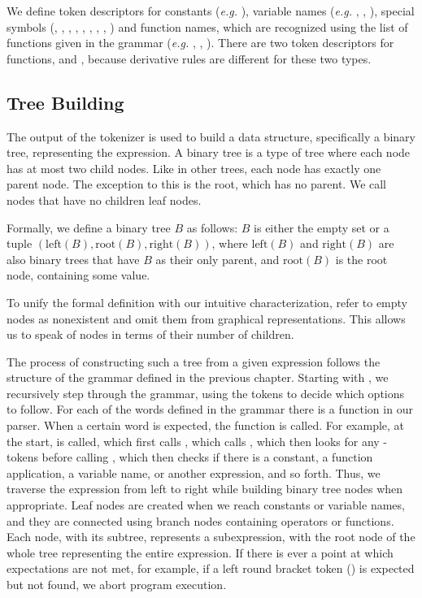 \documentclass[12pt, a4paper]{report}
\begin{document}
We define token descriptors for constants (\textit{e.g.} ), variable names (\textit{e.g.} , , ), special symbols (, , , , , , , , ) and function names, which are recognized using the list of functions given in the grammar (\textit{e.g.}  , , ).
There are two token descriptors for functions,  and , because derivative rules are different for these two types.

\subsection{Tree Building}
The output of the tokenizer is used to build a data structure, specifically a binary tree, representing the expression.
A binary tree is a type of tree where each node has at most two child nodes.
Like in other trees, each node has exactly one parent node.
The exception to this is the root, which has no parent.
We call nodes that have no children leaf nodes.

Formally, we define a binary tree $B$ as follows:
$B$ is either the empty set or a tuple $(\text{left}(B),\text{root}(B),\text{right}(B))$, where $\text{left}(B)$ and $\text{right}(B)$ are also binary trees that have $B$ as their only parent, and $\text{root}(B)$ is the root node, containing some value.

To unify the formal definition with our intuitive characterization, refer to empty nodes as nonexistent and omit them from graphical representations.
This allows us to speak of nodes in terms of their number of children.

The process  of constructing such a tree from a given expression follows the structure of the grammar defined in the previous chapter.
Starting with , we recursively step through the grammar, using the tokens to decide which options to follow.
For each of the words defined in the grammar there is a function in our parser.
When a certain word is expected, the function is called.
For example, at the start,  is called, which first calls , which calls , which then looks for any -tokens before calling , which then checks if there is a constant, a function application, a variable name, or another expression, and so forth.
Thus, we traverse the expression from left to right while building binary tree nodes when appropriate.
Leaf nodes are created when we reach constants or variable names, and they are connected using branch nodes containing operators or functions.
Each node, with its subtree, represents a subexpression, with the root node of the whole tree representing the entire expression.
If there is ever a point at which expectations are not met, for example, if a left round bracket token () is expected but not found, we abort program execution.
\end{document}
